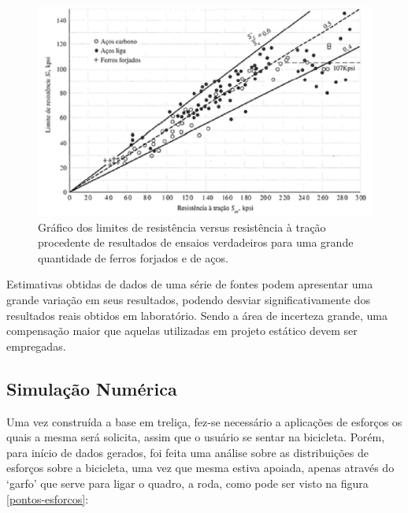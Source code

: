 \begin{figure}[h]
\centering
\includegraphics[scale=0.6]{figuras/resistencia_tracao.png}
\caption{Gráfico dos limites de resistência versus resistência à tração procedente de resultados de ensaios verdadeiros para uma grande quantidade de ferros forjados e de aços.}
\label{grafico-limites}
\end{figure}

Estimativas obtidas de dados de uma série de fontes podem apresentar uma grande variação em seus resultados, podendo desviar significativamente dos resultados reais obtidos em laboratório. Sendo a área de incerteza grande, uma compensação maior que aquelas utilizadas em projeto estático devem ser empregadas.

\subsection{Simulação Numérica}

Uma vez construída a base em treliça, fez-se necessário a aplicações de esforços os quais a mesma será solicita, assim que o usuário se sentar na bicicleta. Porém, para início de dados gerados, foi feita uma análise sobre as distribuições de esforços sobre a bicicleta, uma vez que mesma estiva apoiada, apenas através do ‘garfo’ que serve para ligar o quadro, a roda, como pode ser visto na figura \ref{pontos-esforcos}:

